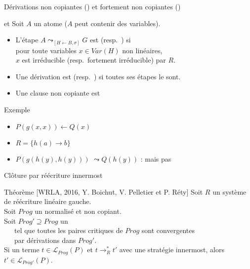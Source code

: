 \begin{frame}{{\large Dérivations non copiantes (\nc) et fortement non copiantes (\snc)}}
  \begin{block}{\nc et \snc}
    Soit $A$ un atome ($A$ peut contenir des variables).\\
    \begin{itemize}[<+->]
    \item L'étape $A \leadsto_{[H\leftarrow B,\sigma]} G$ est \nc (resp.\ \snc) si \\
      pour toute variables $x \in Var(H)$ non linéaires,\\
      $x$ est irréducible (resp.\ fortement irréducible) par $R$.\\
    \item Une dérivation est \nc (resp.\ \snc) si toutes ses étapes le sont.
    \end{itemize}
  \end{block}
  \begin{itemize}[<+->]
  \item Une clause non copiante est \snc
  \end{itemize}
  \begin{exampleblock}{Exemple}
    \begin{itemize}[<+->]
    \item $P(g(x,x)) \leftarrow Q(x)$
    \item $R = \{h(a) \rightarrow b\}$
    \item $P(g(h(y),h(y)))$ $\leadsto Q(h(y))$ : \nc mais pas \snc
    \end{itemize}
  \end{exampleblock}
\end{frame}

\begin{frame}{Clôture par réécriture innermost}
  \begin{alertblock}{Théorème [WRLA, 2016, Y. Boichut, V. Pelletier et P. Réty]}
    Soit $R$ un système de réécriture linéaire gauche.\\
    \pause
    Soit $Prog$ un \csprogramme normalisé et non copiant.\\
    \pause
    Soit $Prog' \supseteq Prog$ un \csprogramme \\
    \pause
    ~~~tel que toutes les paires critiques de $Prog$ sont convergentes\\
    ~~~par dérivations \snc dans $Prog'$.\\
    \pause
    Si un terme $t \in \mathcal{L}_{Prog}(P)$ et $t \rightarrow^*_R t'$ avec une stratégie innermost, alors $t' \in \mathcal L_{Prog'}(P)$.
  \end{alertblock}
\end{frame}
